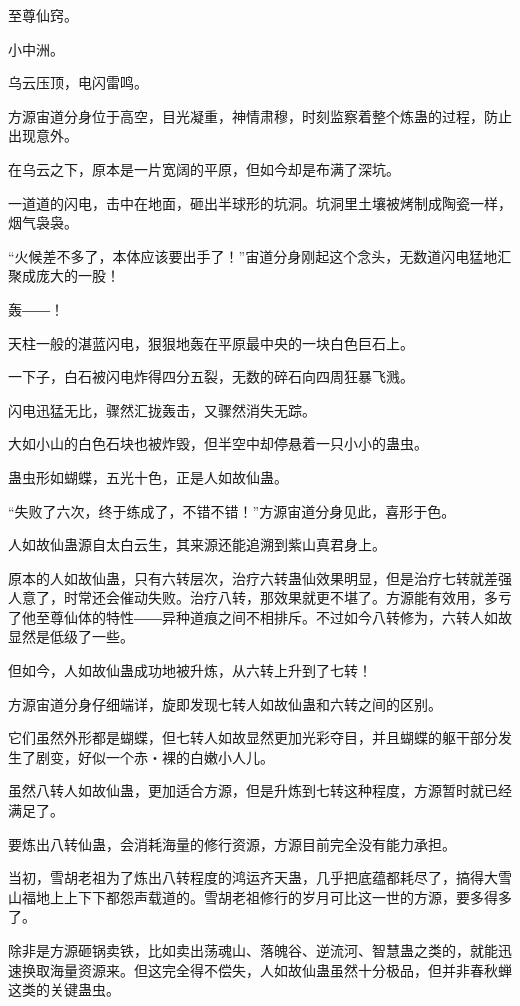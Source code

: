 
\begin{this_body}

至尊仙窍。

小中洲。

乌云压顶，电闪雷鸣。

方源宙道分身位于高空，目光凝重，神情肃穆，时刻监察着整个炼蛊的过程，防止出现意外。

在乌云之下，原本是一片宽阔的平原，但如今却是布满了深坑。

一道道的闪电，击中在地面，砸出半球形的坑洞。坑洞里土壤被烤制成陶瓷一样，烟气袅袅。

“火候差不多了，本体应该要出手了！”宙道分身刚起这个念头，无数道闪电猛地汇聚成庞大的一股！

轰――！

天柱一般的湛蓝闪电，狠狠地轰在平原最中央的一块白色巨石上。

一下子，白石被闪电炸得四分五裂，无数的碎石向四周狂暴飞溅。

闪电迅猛无比，骤然汇拢轰击，又骤然消失无踪。

大如小山的白色石块也被炸毁，但半空中却停悬着一只小小的蛊虫。

蛊虫形如蝴蝶，五光十色，正是人如故仙蛊。

“失败了六次，终于练成了，不错不错！”方源宙道分身见此，喜形于色。

人如故仙蛊源自太白云生，其来源还能追溯到紫山真君身上。

原本的人如故仙蛊，只有六转层次，治疗六转蛊仙效果明显，但是治疗七转就差强人意了，时常还会催动失败。治疗八转，那效果就更不堪了。方源能有效用，多亏了他至尊仙体的特性――异种道痕之间不相排斥。不过如今八转修为，六转人如故显然是低级了一些。

但如今，人如故仙蛊成功地被升炼，从六转上升到了七转！

方源宙道分身仔细端详，旋即发现七转人如故仙蛊和六转之间的区别。

它们虽然外形都是蝴蝶，但七转人如故显然更加光彩夺目，并且蝴蝶的躯干部分发生了剧变，好似一个赤・裸的白嫩小人儿。

虽然八转人如故仙蛊，更加适合方源，但是升炼到七转这种程度，方源暂时就已经满足了。

要炼出八转仙蛊，会消耗海量的修行资源，方源目前完全没有能力承担。

当初，雪胡老祖为了炼出八转程度的鸿运齐天蛊，几乎把底蕴都耗尽了，搞得大雪山福地上上下下都怨声载道的。雪胡老祖修行的岁月可比这一世的方源，要多得多了。

除非是方源砸锅卖铁，比如卖出荡魂山、落魄谷、逆流河、智慧蛊之类的，就能迅速换取海量资源来。但这完全得不偿失，人如故仙蛊虽然十分极品，但并非春秋蝉这类的关键蛊虫。


\end{this_body}
